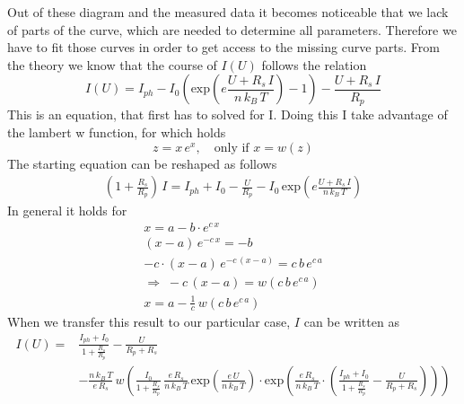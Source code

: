 \documentclass[a4paper, 12pt]{scrartcl}
\begin{document}
Out of these diagram and the measured data it becomes noticeable that we lack of parts of the curve, which are needed to determine all parameters. Therefore we have to fit those curves in order to get access to the missing curve parts. From the theory we know that the course of $I(U)$ follows the relation
\begin{equation*}I(U)=I_{ph}-I_0\left(\text{exp}\left(e\frac{U+R_s\,I}{n\,k_B\,T}\right)-1\right)-\frac{U+R_s\,I}{R_p}\end{equation*}
This is an equation, that first has to solved for I. Doing this I take advantage of the lambert w function, for which holds
\begin{equation*}z=x\,e^{x},\quad\text{only if }x=w(z)\end{equation*}
The starting equation can be reshaped as follows
\begin{gather*}\left(1+\frac{R_s}{R_p}\right)\,I=I_{ph}+I_0-\frac{U}{R_p}-I_0\,\text{exp}\left(e\frac{U+R_s\,I}{n\,k_B\,T}\right)\end{gather*}
In general it holds for
\begin{gather*}x=a-b\cdot{e}^{c\,x}\\(x-a)\,e^{-c\,x}=-b\\-c\cdot(x-a)\,e^{-c\,(x-a)}=c\,b\,e^{c\,a}\\\Rightarrow\;-c\,(x-a)=w\left(c\,b\,e^{c\,a}\right)\\
x=a-\frac{1}{c}\,w\left(c\,b\,e^{c\,a}\right)\end{gather*}
When we transfer this result to our particular case, $I$ can be written as
\begin{align*}I(U)=&\frac{I_{ph}+I_0}{1+\frac{R_s}{R_p}}-\frac{U}{R_p+R_s}\\
&-\frac{n\,k_B\,T}{e\,R_s}\,w\left(\frac{I_0}{1+\frac{R_s}{R_p}}\,\frac{e\,R_s}{n\,k_B\,T}\,\text{exp}\left(\frac{e\,U}{n\,k_B\,T}\right)\cdot\text{exp}\left(\frac{e\,R_s}{n\,k_B\,T}\cdot\left(\frac{I_{ph}+I_0}{1+\frac{R_s}{R_p}}-\frac{U}{R_p+R_s}\right)\right)\right)\end{align*}
\end{document}
